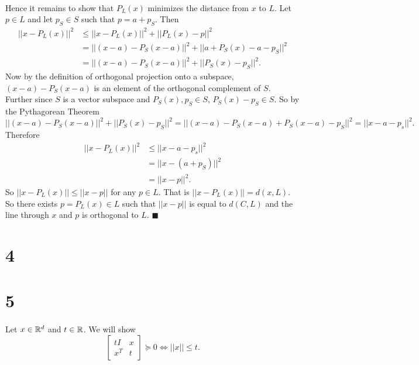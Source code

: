 \documentclass[letterpaper,12pt,oneside,onecolumn]{article}
\begin{document}
\paragraph{}
Hence it remains to show that $P_L(x)$ minimizes the distance from $x$ to $L$. Let $p \in L$ and let $p_S \in S$ such that $p = a + p_S$. Then
\begin{align*}
||x- P_L(x) ||^2 &\leq ||x - P_L(x) ||^2 + ||P_L(x) - p||^2 \\
&= ||(x-a) - P_S(x-a) ||^2 + ||a + P_S(x) - a - p_S ||^2 \\
&= ||(x-a) - P_S(x-a) ||^2 + ||P_S(x) - p_S||^2.
\end{align*}
Now by the definition of orthogonal projection onto a subspace, $(x-a) - P_S(x-a)$ is an element of the orthogonal complement of $S$. Further since $S$ is a vector subspace and $P_S(x), p_S \in S$, $P_S(x) - p_S \in S$. So by the Pythagorean Theorem
$$ ||(x-a) - P_S(x-a) ||^2 + ||P_S(x) - p_S||^2 = ||(x-a) - P_S(x-a) + P_S(x-a) - p_S||^2 = ||x-a - p_s||^2.$$
Therefore 
\begin{align*}
||x- P_L(x) ||^2 &\leq ||x-a - p_s||^2 \\
&= ||x - (a+ p_S) ||^2 \\
&= ||x - p||^2.
\end{align*}
So $||x- P_L(x) || \leq ||x-p||$ for any $p \in L$. That is $||x - P_L(x)|| = d(x,L)$. So there exists $p = P_L(x) \in L$ such that $||x-p||$ is equal to $d(C, L)$ and the line through $x$ and $p$ is orthogonal to $L$. $\blacksquare$
\section*{4}

\section*{5}
\paragraph{}
Let $x \in \mathbb{R}^d$ and $t\in \mathbb{R}$. We will show
$$\begin{bmatrix}tI & x \\ x^T & t \end{bmatrix} \succcurlyeq 0 \iff ||x|| \leq t.$$
\end{document}
